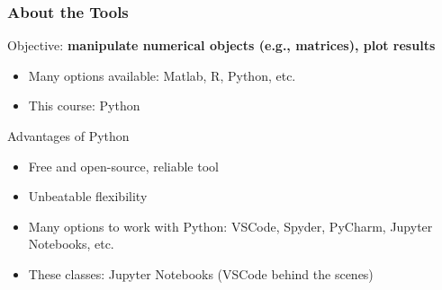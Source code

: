 \documentclass[10pt, aspectratio=1610, handout]{beamer}
\begin{document}
  \begin{frame}
    \frametitle{About the Tools}

    Objective: \textbf{manipulate numerical objects (e.g., matrices), plot results}

    \vfill\pause

    \begin{itemize}
      \item Many options available: Matlab, R, Python, etc.
      \item This course: Python
    \end{itemize}

    \vfill\pause

    Advantages of Python
    \begin{itemize}
      \item Free and open-source, reliable tool
      \item Unbeatable flexibility
    \end{itemize}

    \vfill\pause

    \begin{itemize}
      \item Many options to work with Python: VSCode, Spyder, PyCharm, Jupyter Notebooks, etc.
      \item These classes: Jupyter Notebooks (VSCode behind the scenes)
    \end{itemize}

  \end{frame}
\end{document}

